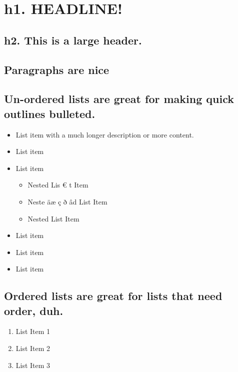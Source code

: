 \documentclass{juwit}
\begin{document}
 \section*{h1. HEADLINE!} 

       \subsection*{h2. This is a large header.} 

       \subsection*{Paragraphs are nice} 
       \par\addvspace{\medskipamount}\noindent 
        \lipsum[1]
       
       \par\addvspace{\medskipamount}\noindent
       \lipsum[2]
       
       \par\addvspace{\medskipamount}\noindent
       \lipsum[3]

       \subsection*{Un-ordered lists are great for making quick outlines bulleted.} 
       \begin{itemize} 
         \item List item with a much longer description or more content. 
         \item List item 
         \item List item
           \begin{itemize} 
             \item Nested Lis \euro{} t Item 
             \item Neste äæ ç ð âd List Item 
             \item Nested List Item 
           \end{itemize} 
         
         \item List item 
         \item List item 
         \item List item 
       \end{itemize} 

       \subsection*{Ordered lists are great for lists that need order, duh.} 
       \begin{enumerate} 
         \item List Item 1 
         \item List Item 2 
         \item List Item 3 
       \end{enumerate} 
       \par\addvspace{\medskipamount}\noindent
       \lipsum[4]
    
 
\end{document}
